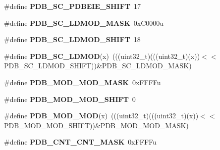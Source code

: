 \begin{DoxyCompactItemize}
\item 
\#define {\bfseries P\+D\+B\+\_\+\+S\+C\+\_\+\+P\+D\+B\+E\+I\+E\+\_\+\+S\+H\+I\+FT}~17\hypertarget{group__PDB__Register__Masks_gaa64d610e568a9cafe7d2110a76daf8df}{}\label{group__PDB__Register__Masks_gaa64d610e568a9cafe7d2110a76daf8df}

\item 
\#define {\bfseries P\+D\+B\+\_\+\+S\+C\+\_\+\+L\+D\+M\+O\+D\+\_\+\+M\+A\+SK}~0x\+C0000u\hypertarget{group__PDB__Register__Masks_ga78d77e651e5cc9a5ddeb63fa6ac627af}{}\label{group__PDB__Register__Masks_ga78d77e651e5cc9a5ddeb63fa6ac627af}

\item 
\#define {\bfseries P\+D\+B\+\_\+\+S\+C\+\_\+\+L\+D\+M\+O\+D\+\_\+\+S\+H\+I\+FT}~18\hypertarget{group__PDB__Register__Masks_ga53a8856bc6371ac178123477526e8249}{}\label{group__PDB__Register__Masks_ga53a8856bc6371ac178123477526e8249}

\item 
\#define {\bfseries P\+D\+B\+\_\+\+S\+C\+\_\+\+L\+D\+M\+OD}(x)~(((uint32\+\_\+t)(((uint32\+\_\+t)(x))$<$$<$P\+D\+B\+\_\+\+S\+C\+\_\+\+L\+D\+M\+O\+D\+\_\+\+S\+H\+I\+FT))\&P\+D\+B\+\_\+\+S\+C\+\_\+\+L\+D\+M\+O\+D\+\_\+\+M\+A\+SK)\hypertarget{group__PDB__Register__Masks_ga6b704d8e041f977dfe02f0288a8e01bd}{}\label{group__PDB__Register__Masks_ga6b704d8e041f977dfe02f0288a8e01bd}

\item 
\#define {\bfseries P\+D\+B\+\_\+\+M\+O\+D\+\_\+\+M\+O\+D\+\_\+\+M\+A\+SK}~0x\+F\+F\+F\+Fu\hypertarget{group__PDB__Register__Masks_ga9dddc13b37ba4e27c8401dfa56b2173f}{}\label{group__PDB__Register__Masks_ga9dddc13b37ba4e27c8401dfa56b2173f}

\item 
\#define {\bfseries P\+D\+B\+\_\+\+M\+O\+D\+\_\+\+M\+O\+D\+\_\+\+S\+H\+I\+FT}~0\hypertarget{group__PDB__Register__Masks_gaf224ebff31aea3bd5318f078eccf060e}{}\label{group__PDB__Register__Masks_gaf224ebff31aea3bd5318f078eccf060e}

\item 
\#define {\bfseries P\+D\+B\+\_\+\+M\+O\+D\+\_\+\+M\+OD}(x)~(((uint32\+\_\+t)(((uint32\+\_\+t)(x))$<$$<$P\+D\+B\+\_\+\+M\+O\+D\+\_\+\+M\+O\+D\+\_\+\+S\+H\+I\+FT))\&P\+D\+B\+\_\+\+M\+O\+D\+\_\+\+M\+O\+D\+\_\+\+M\+A\+SK)\hypertarget{group__PDB__Register__Masks_ga6e9107df37db341b8d9f7041561354a1}{}\label{group__PDB__Register__Masks_ga6e9107df37db341b8d9f7041561354a1}

\item 
\#define {\bfseries P\+D\+B\+\_\+\+C\+N\+T\+\_\+\+C\+N\+T\+\_\+\+M\+A\+SK}~0x\+F\+F\+F\+Fu\hypertarget{group__PDB__Register__Masks_ga2c5797892b612935a1eb7ba29ea0d202}{}\label{group__PDB__Register__Masks_ga2c5797892b612935a1eb7ba29ea0d202}


\end{DoxyCompactItemize}

